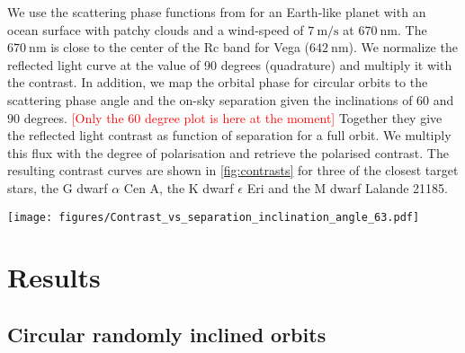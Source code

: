 \documentclass[
    usenatbib,
]{mnras}
\newcommand{\todo}[1]{\textcolor{red}{[#1]}}
\newcommand{\IWA}{\ensuremath{\mathrm{IWA}}}
\newcommand{\hwo}{HabWorlds}
\begin{document}
We use the scattering phase functions from \cite{treesstam2019} for an Earth-like planet with an ocean surface with patchy clouds and a wind-speed of $\SI{7}{\meter\per\second}$ at $\SI{670}{\nano\meter}$.
%
The $\SI{670}{\nano\meter}$ is close to the center of the Rc band for Vega ($\SI{642}{\nano\meter}$). 
%
We normalize the reflected light curve at the value of 90 degrees (quadrature) and multiply it with the contrast.
%
In addition, we map the orbital phase for circular orbits to the scattering phase angle and the on-sky separation given the inclinations of $60$ and $90$ degrees. \todo{Only the 60 degree plot is here at the moment}
%
Together they give the reflected light contrast as function of separation for a full orbit.
%
We multiply this flux with the degree of polarisation and retrieve the polarised contrast.
%
The resulting contrast curves are shown in \cref{fig:contrasts} for three of the closest target stars, the G dwarf $\alpha$ Cen A, the K dwarf $\epsilon$ Eri and the M dwarf Lalande 21185.

\begin{figure*}%
   \centering
   \texttt{[image: figures/Contrast\_vs\_separation\_inclination\_angle\_63.pdf]}
   \caption{
    The reflected light contrast and orbital separation of an Earth-like planet with an ocean surface and patchy clouds over a planetary orbit assuming an orbital inclination of $60^\circ$ for the stars $\alpha$ Cen A, $\epsilon$ Eri and Lalande 21185. The solid line indicates the contrast in unpolarised light with the contrast at quadrature marked by a solid dot. The polarised component is indicated by the colored dots for which the color represents the scattering phase angle from quadrature. The light grey points show the quadrature contrasts of the other targets in the star list and the dashed lines indicate $1,2$ and $3$ times the \IWA\ for \hwo.
    }
    \label{fig:contrasts}
\end{figure*}


\section{Results}


\subsection{Circular randomly inclined orbits}
\label{sec:circular}
\end{document}
